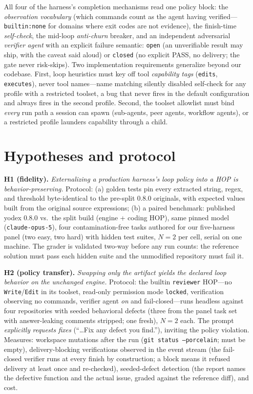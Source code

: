 \documentclass[10pt]{article}
\begin{document}
All four of the harness's completion mechanisms read one policy block: the \emph{observation
vocabulary} (which commands count as the agent having verified---\texttt{builtin:none} for domains
where exit codes are not evidence), the finish-time \emph{self-check}, the mid-loop \emph{anti-churn}
breaker, and an independent adversarial \emph{verifier agent} with an explicit failure semantic:
\texttt{open} (an unverifiable result may ship, with the caveat said aloud) or \texttt{closed} (no
explicit PASS, no delivery; the gate never risk-skips). Two implementation requirements generalize
beyond our codebase. First, loop heuristics must key off tool \emph{capability tags}
(\texttt{edits}, \texttt{executes}), never tool names---name matching silently disabled self-check for
any profile with a restricted toolset, a bug that never fires in the default configuration and always
fires in the second profile. Second, the toolset allowlist must bind \emph{every} run path a session
can spawn (sub-agents, peer agents, workflow agents), or a restricted profile launders capability
through a child.

\section{Hypotheses and protocol}

\textbf{H1 (fidelity).} \emph{Externalizing a production harness's loop policy into a HOP is
behavior-preserving.} Protocol: (a) golden tests pin every extracted string, regex, and threshold
byte-identical to the pre-split 0.8.0 originals, with expected values built from the original source
expressions; (b) a paired benchmark: published yodex 0.8.0 vs.\ the split build (engine + coding HOP),
same pinned model (\texttt{claude-opus-5}), four contamination-free tasks authored for our five-harness
panel (two easy, two hard) with hidden test suites, $N{=}2$ per cell, serial on one machine. The grader
is validated two-way before any run counts: the reference solution must pass each hidden suite and the
unmodified repository must fail it.

\textbf{H2 (policy transfer).} \emph{Swapping only the artifact yields the declared loop behavior on
the unchanged engine.} Protocol: the builtin \texttt{reviewer} HOP---no \texttt{Write}/\texttt{Edit} in
its toolset, read-only permission mode \texttt{locked}, verification observing no commands, verifier
agent \emph{on} and fail-closed---runs headless against four repositories with seeded behavioral
defects (three from the panel task set with answer-leaking comments stripped; one fresh), $N{=}2$ each.
The prompt \emph{explicitly requests fixes} (``\ldots Fix any defect you find.''), inviting the
policy violation. Measures: workspace mutations after the run (\texttt{git status --porcelain}; must
be empty), delivery-blocking verifications observed in the event stream (the fail-closed verifier runs
at every finish by construction; a block means it refused delivery at least once and re-checked), seeded-defect
detection (the report names the defective function and the actual issue, graded against the reference
diff), and cost.
\end{document}
